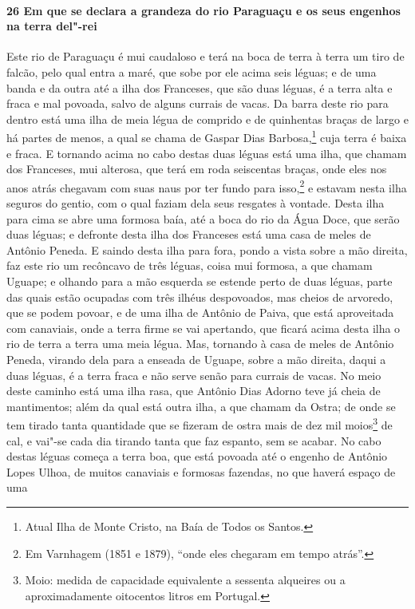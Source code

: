 \paragraph{26 Em que se declara a grandeza do rio Paraguaçu e os seus engenhos na terra
del"-rei}

Este rio de Paraguaçu é mui caudaloso e terá na boca de terra à terra um tiro de falcão,
pelo qual entra a maré, que sobe por ele acima seis léguas; e de uma banda e da outra até
a ilha dos Franceses, que são duas léguas, é a terra alta e fraca e mal povoada, salvo de
alguns currais de vacas. Da barra deste rio para dentro está uma ilha de meia légua de
comprido e de quinhentas braças de largo e há partes de menos, a qual se chama de Gaspar
Dias Barbosa,\footnote{ Atual Ilha de Monte Cristo, na Baía de Todos os Santos.} cuja
terra é baixa e fraca. E tornando acima no cabo destas duas léguas está uma ilha, que
chamam dos Franceses, mui alterosa, que terá em roda seiscentas braças, onde eles nos anos
atrás chegavam com suas naus por ter fundo para isso,\footnote{ Em Varnhagem (1851 e
1879), ``onde eles chegaram em tempo atrás''.} e estavam nesta ilha seguros do gentio, com
o qual faziam dela seus resgates à vontade. Desta ilha para cima se abre uma formosa baía,
até a boca do rio da Água Doce, que serão duas léguas; e defronte desta ilha dos Franceses
está uma casa de meles de Antônio Peneda. E saindo desta ilha para fora, pondo a vista
sobre a mão direita, faz este rio um recôncavo de três léguas, coisa mui formosa, a que
chamam Uguape; e olhando para a mão esquerda se estende perto de duas léguas, parte das
quais estão ocupadas com três ilhéus despovoados, mas cheios de arvoredo, que se podem
povoar, e de uma ilha de Antônio de Paiva, que está aproveitada com canaviais, onde a
terra firme se vai apertando, que ficará acima desta ilha o rio de terra a terra uma meia
légua. Mas, tornando à casa de meles de Antônio Peneda, virando dela para a enseada de
Uguape, sobre a mão direita, daqui a duas léguas, é a terra fraca e não serve senão para
currais de vacas. No meio deste caminho está uma ilha rasa, que Antônio Dias Adorno teve
já cheia de mantimentos; além da qual está outra ilha, a que chamam da Ostra; de onde se
tem tirado tanta quantidade que se fizeram de ostra mais de dez mil moios\footnote{ Moio:
medida de capacidade equivalente a sessenta alqueires ou a aproximadamente oitocentos
litros em Portugal.} de cal, e vai"-se cada dia tirando tanta que faz espanto, sem se
acabar. No cabo destas léguas começa a terra boa, que está povoada até o engenho de
Antônio Lopes Ulhoa, de muitos canaviais e formosas fazendas, no que haverá espaço de uma
